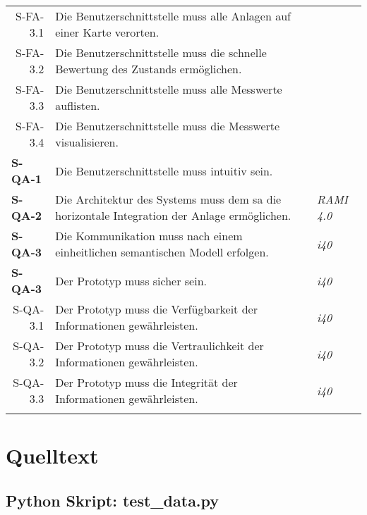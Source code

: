 \begin{tabularx}{\textwidth}{@{}lXp{2cm}@{}}
      \multicolumn{1}{r}{S-FA-3.1} &  Die Benutzerschnittstelle muss alle Anlagen auf einer Karte verorten. \\
      \multicolumn{1}{r}{S-FA-3.2} &  Die Benutzerschnittstelle muss die schnelle Bewertung des Zustands ermöglichen. \\
      \multicolumn{1}{r}{S-FA-3.3} &  Die Benutzerschnittstelle muss alle Messwerte auflisten. \\
      \multicolumn{1}{r}{S-FA-3.4} &  Die Benutzerschnittstelle muss die Messwerte visualisieren. \\
      \textbf{S-QA-1}              & Die Benutzerschnittstelle muss intuitiv sein.   \\
      \textbf{S-QA-2}              & Die Architektur des Systems muss dem \ac{sa} die horizontale Integration der Anlage ermöglichen.   & \textit{RAMI 4.0} \\
      \textbf{S-QA-3}              &  Die Kommunikation muss nach einem einheitlichen semantischen Modell erfolgen.  & \textit{\ac{i40}} \\
      \textbf{S-QA-3}              &  Der Prototyp muss sicher sein.  & \textit{\ac{i40}} \\
      \multicolumn{1}{r}{S-QA-3.1}              &  Der Prototyp muss die Verfügbarkeit der Informationen gewährleisten.  & \textit{\ac{i40}} \\
      \multicolumn{1}{r}{S-QA-3.2}              &  Der Prototyp muss die Vertraulichkeit der Informationen gewährleisten.  & \textit{\ac{i40}} \\
      \multicolumn{1}{r}{S-QA-3.3}              &  Der Prototyp muss die Integrität der Informationen gewährleisten. & \textit{\ac{i40}} \\
      \addlinespace
      \bottomrule
      \caption{Anforderungen aus Systemebene}
      \label{system_anforderungen}
  \end{tabularx}

\section{Quelltext}

\subsection{Python Skript: test\_data.py}

